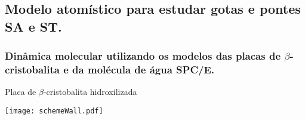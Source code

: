 \documentclass[8pt]{beamer}
\begin{document}
\subsection{Modelo atomístico para estudar gotas e pontes SA e ST.}

\begin{frame}
	\frametitle{\textbf{Dinâmica molecular} utilizando os modelos das placas de $\beta$-cristobalita e da molécula de água SPC/E.}
		\vspace{-0.15cm}
		\begin{block}{Placa de $\beta$-cristobalita hidroxilizada}
				\begin{minipage}{0.22\textwidth}
						\texttt{[image: schemeWall.pdf]}
				\end{minipage}
				\begin{minipage}{0.21\textwidth}
				   	

\end{minipage}
\end{block}
\end{frame}
\end{document}

